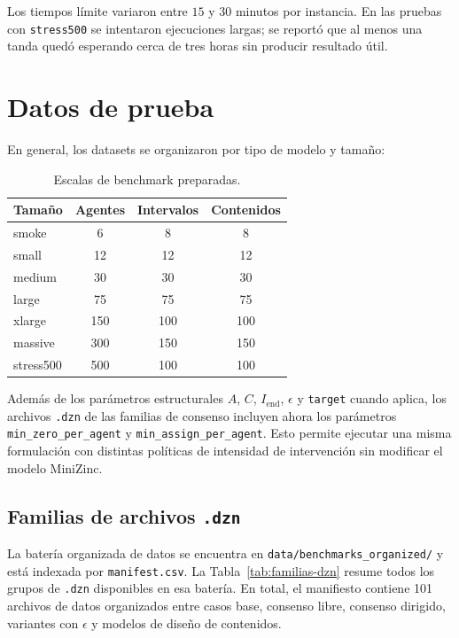 \documentclass[10pt,letterpaper]{article}
\begin{document}
Los tiempos l\'imite variaron entre \(15\) y \(30\) minutos por instancia. En las pruebas con \texttt{stress500} se intentaron ejecuciones largas; se report\'o que al menos una tanda qued\'o esperando cerca de tres horas sin producir resultado \'util.

\section{Datos de prueba}

En general, los datasets se organizaron por tipo de modelo y tama\~no:

\begin{table}[H]
\centering
\caption{Escalas de benchmark preparadas.}
\begin{tabular}{lccc}
\toprule
\textbf{Tama\~no} & \textbf{Agentes} & \textbf{Intervalos} & \textbf{Contenidos} \\
\midrule
smoke & 6 & 8 & 8 \\
small & 12 & 12 & 12 \\
medium & 30 & 30 & 30 \\
large & 75 & 75 & 75 \\
xlarge & 150 & 100 & 100 \\
massive & 300 & 150 & 150 \\
stress500 & 500 & 100 & 100 \\
\bottomrule
\end{tabular}
\end{table}

Adem\'as de los par\'ametros estructurales \(A\), \(C\), \(I_{\text{end}}\), \(\epsilon\) y \texttt{target} cuando aplica, los archivos \texttt{.dzn} de las familias de consenso incluyen ahora los par\'ametros \texttt{min\_zero\_per\_agent} y \texttt{min\_assign\_per\_agent}. Esto permite ejecutar una misma formulaci\'on con distintas pol\'iticas de intensidad de intervenci\'on sin modificar el modelo MiniZinc.

\subsection{Familias de archivos \texttt{.dzn}}

La bater\'ia organizada de datos se encuentra en \texttt{data/benchmarks\_organized/} y est\'a indexada por \texttt{manifest.csv}. La Tabla~\ref{tab:familias-dzn} resume todos los grupos de \texttt{.dzn} disponibles en esa bater\'ia. En total, el manifiesto contiene 101 archivos de datos organizados entre casos base, consenso libre, consenso dirigido, variantes con \(\epsilon\) y modelos de dise\~no de contenidos.
\end{document}
